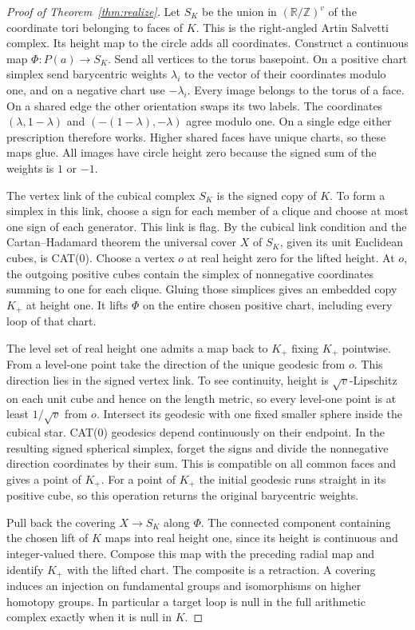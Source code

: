 \documentclass[11pt,letterpaper]{article}
\numberwithin{equation}{section}
\begin{document}
\begin{proof}[Proof of Theorem~\ref{thm:realize}]

Let \(S_K\) be the union in \((\mathbb R/\mathbb Z)^v\) of the coordinate tori belonging to
faces of \(K\). This is the right-angled Artin Salvetti complex. Its height map to the circle
adds all coordinates. Construct a continuous map \(\Phi:P(a)\to S_K\). Send all vertices to
the torus basepoint. On a positive chart simplex send barycentric weights \(\lambda_i\) to the
vector of their coordinates modulo one, and on a negative chart use \(-\lambda_i\). Every
image belongs to the torus of a face. On a shared edge the other orientation swaps its two
labels. The coordinates \((\lambda,1-\lambda)\) and \((-(1-\lambda),-\lambda)\) agree modulo
one. On a single edge either prescription therefore works. Higher shared faces have unique
charts, so these maps glue. All images have circle height zero because the signed sum of the
weights is \(1\) or \(-1\).

The vertex link of the cubical complex \(S_K\) is the signed copy of \(K\). To form a simplex
in this link, choose a sign for each member of a clique and choose at most one sign of each
generator. This link is flag. By the cubical link condition and the Cartan--Hadamard theorem
\cite[Chapters II.4--II.5]{bh} the universal cover \(X\) of \(S_K\), given its unit Euclidean
cubes, is CAT(0). Choose a vertex \(o\) at real height zero for the lifted height. At \(o\),
the outgoing positive cubes contain the simplex of nonnegative coordinates summing to one for
each clique. Gluing those simplices gives an embedded copy \(K_+\) at height one. It lifts
\(\Phi\) on the entire chosen positive chart, including every loop of that chart.

The level set of real height one admits a map back to \(K_+\) fixing \(K_+\) pointwise. From a
level-one point take the direction of the unique geodesic from \(o\). This direction lies in
the signed vertex link. To see continuity, height is \(\sqrt v\)-Lipschitz on each unit cube
and hence on the length metric, so every level-one point is at least \(1/\sqrt v\) from \(o\).
Intersect its geodesic with one fixed smaller sphere inside the cubical star. CAT(0) geodesics
depend continuously on their endpoint. In the resulting signed spherical simplex, forget the
signs and divide the nonnegative direction coordinates by their sum. This is compatible on all
common faces and gives a point of \(K_+\). For a point of \(K_+\) the initial geodesic runs
straight in its positive cube, so this operation returns the original barycentric weights.

Pull back the covering \(X\to S_K\) along \(\Phi\). The connected component containing the
chosen lift of \(K\) maps into real height one, since its height is continuous and
integer-valued there. Compose this map with the preceding radial map and identify \(K_+\) with
the lifted chart. The composite is a retraction. A covering induces an injection on
fundamental groups and isomorphisms on higher homotopy groups. In particular a target loop is
null in the full arithmetic complex exactly when it is null in \(K\).
\end{proof}
\end{document}
